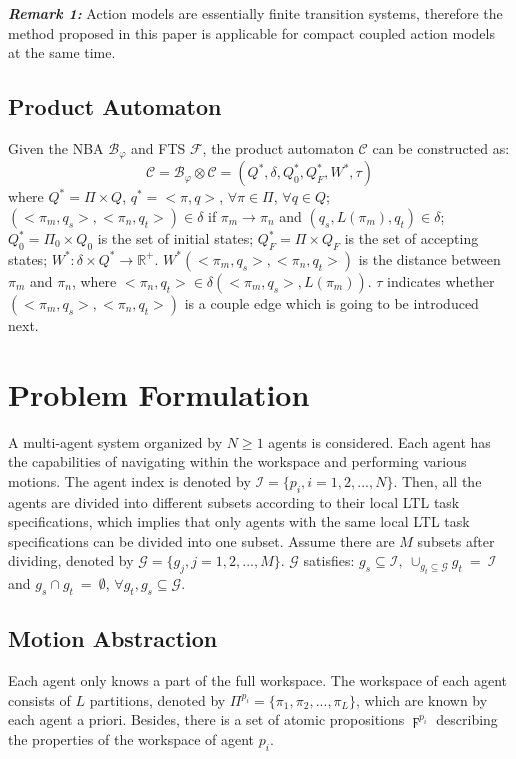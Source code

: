 \documentclass[journal]{IEEEtran}
\begin{document}
\textbf{\emph{Remark 1:}} Action models are essentially finite transition systems, therefore the method proposed in this paper is applicable for compact coupled action models at the same time.
\subsection{Product Automaton}
Given the NBA $\mathcal{B}_\varphi$ and FTS $\mathcal{F}$, the product automaton $\mathcal{C}$ can be constructed as:
$$\mathcal{C}=\mathcal{B}_\varphi\otimes \mathcal{C}=(Q^{\ast},\delta,Q^{\ast}_0,Q^{\ast}_F,W^{\ast},\tau)$$
where $Q^{\ast}=\Pi\times Q$, $q^{\ast}=<\pi,q>$, $\forall \pi \in \Pi$, $\forall q \in Q$; $(<\pi_m,q_s>,<\pi_n,q_t>)\in \delta$ if $\pi_m \rightarrow \pi_n$ and $(q_s,L(\pi_m),q_t)\in \delta$; $Q^{\ast}_0=\Pi_0\times Q_0$ is the set of initial states; $Q^{\ast}_F=\Pi\times Q_F$ is the set of accepting states; $W^{\ast}:\delta\times Q^{\ast}\rightarrow \mathbb{R}^{+}$. $W^{\ast}(<\pi_m,q_s>,<\pi_n,q_t>)$ is the distance between $\pi_m$ and $\pi_n$, where $<\pi_n,q_t>\in \delta(<\pi_m,q_s>,L(\pi_m))$. $\tau$ indicates whether $(<\pi_m,q_s>,<\pi_n,q_t>)$ is a couple edge which is going to be introduced next.
\section{Problem Formulation}
A multi-agent system organized by $N\geq1$ agents is considered. Each agent has the capabilities of navigating within the workspace and performing various motions. The agent index is denoted by $\mathcal{I}=\{p_i,i=1,2,...,N\}$. Then, all the agents are divided into different subsets according to their local LTL task specifications, which implies that only agents with the same local LTL task specifications can be divided into one subset. Assume there are $M$ subsets after dividing, denoted by $\mathcal{G}=\{g_j,j=1,2,...,M\}$. $\mathcal{G}$ satisfies: $g_s\subseteq \mathcal{I},\ \cup_{g_t\subseteq \mathcal{G}}g_t\ =\ \mathcal{I}$ and $g_s\cap g_t\ =\ \emptyset$, $\forall g_t,g_s \subseteq \mathcal{G}$.
\subsection{Motion Abstraction}
Each agent only knows a part of the full workspace. The workspace of each agent consists of $L$ partitions, denoted by $\Pi^{p_i}=\{\pi_1,\pi_2,...,\pi_L\}$, which are known by each agent a priori. Besides, there is a set of atomic propositions $\digamma^{p_i}$ describing the properties of the workspace of agent $p_i$.
\end{document}
